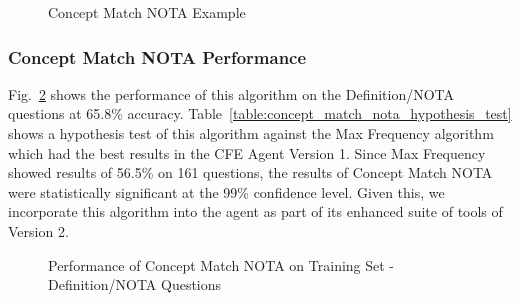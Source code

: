 \begin{figure}
\centering
\vspace{0.75in}
\caption{Concept Match NOTA Example}
\label{fig:concept_match_nota_example}
\end{figure}

\subsubsection{Concept Match NOTA Performance}

Fig.~\ref{fig:concept_match_nota_training_set_performance} shows the performance of this algorithm on the Definition/NOTA questions at 65.8\% accuracy.  Table~\ref{table:concept_match_nota_hypothesis_test} shows a hypothesis test of this algorithm against the Max Frequency algorithm which had the best results in the CFE Agent Version 1.  Since Max Frequency showed results of 56.5\% on 161 questions, the results of Concept Match NOTA were statistically significant at the 99\% confidence level.  Given this, we incorporate this algorithm into the agent as part of its enhanced suite of tools of Version 2.

\begin{figure}
\centering
\vspace{0.75in}
\caption{Performance of Concept Match NOTA on Training Set - Definition/NOTA Questions}
\label{fig:concept_match_nota_training_set_performance}
\end{figure}



